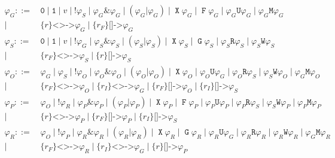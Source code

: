 \documentclass[a4paper,twoside,10pt,DIV=12,draft]{scrreprt}
\DeclareMathOperator{\F}{\texttt{F}}
\DeclareMathOperator{\G}{\texttt{G}}
\newcommand{\U}{\mathbin{\texttt{U}}}
\newcommand{\R}{\mathbin{\texttt{R}}}
\DeclareMathOperator{\X}{\texttt{X}}
\newcommand{\M}{\mathbin{\texttt{M}}}
\newcommand{\W}{\mathbin{\texttt{W}}}
\DeclareMathOperator{\NOT}{\texttt{!}}
\newcommand{\OR}{\mathbin{\texttt{|}}}
\newcommand{\AND}{\mathbin{\texttt{\&}}}
\newcommand{\0}{\texttt{0}}
\newcommand{\1}{\texttt{1}}
\newcommand{\Esuffix}{\texttt{<>->}}
\newcommand{\Asuffix}{\texttt{[]->}}
\newcommand{\ratgroup}[1]{\texttt{\{}#1\texttt{\}}}
\begin{document}
\begin{align*}
  \varphi_G ::=&\, \0\mid\1\mid v\mid \NOT\varphi_S\mid
                   \varphi_G\AND \varphi_G\mid (\varphi_G\OR \varphi_G)\mid
                   \X\varphi_G \mid \F\varphi_G\mid
                   \varphi_G\U\varphi_G\mid \varphi_G\M\varphi_G\\
           \mid&\, \ratgroup{r}\Esuffix \varphi_G\mid
                   \ratgroup{r_F}\Asuffix \varphi_G\\
  \varphi_S ::=&\, \0\mid\1\mid v\mid \NOT\varphi_G\mid
                   \varphi_S\AND \varphi_S\mid (\varphi_S\OR \varphi_S)\mid
                   \X\varphi_S \mid \G\varphi_S\mid
                   \varphi_S\R\varphi_S\mid \varphi_S\W\varphi_S\\
           \mid&\, \ratgroup{r_F}\Esuffix \varphi_S\mid
                   \ratgroup{r}\Asuffix \varphi_S\\
  \varphi_O ::=&\, \varphi_G \mid \varphi_S\mid \NOT\varphi_O\mid
                   \varphi_O\AND \varphi_O\mid (\varphi_O\OR \varphi_O)\mid
                   \X\varphi_O \mid
                   \varphi_O\U\varphi_G\mid\varphi_O\R\varphi_S \mid
                   \varphi_S\W\varphi_O\mid \varphi_G\M\varphi_O\\
           \mid&\, \ratgroup{r_F}\Esuffix \varphi_O \mid \ratgroup{r_I}\Esuffix \varphi_G\mid
                  \ratgroup{r_F}\Asuffix \varphi_O\mid
                   \ratgroup{r_I}\Asuffix \varphi_S\\
  \varphi_P ::=&\, \varphi_O \mid \NOT\varphi_R\mid
                   \varphi_P\AND \varphi_P\mid (\varphi_P\OR \varphi_P)\mid
                   \X\varphi_P \mid \F\varphi_P \mid
                   \varphi_P\U\varphi_P\mid\varphi_P\R\varphi_S\mid
                   \varphi_S\W\varphi_P\mid\varphi_P\M\varphi_P\\
           \mid&\, \ratgroup{r}\Esuffix \varphi_P\mid
                   \ratgroup{r_F}\Asuffix \varphi_P\mid
                   \ratgroup{r_I}\Asuffix \varphi_S\\
  \varphi_R ::=&\, \varphi_O \mid \NOT\varphi_P\mid
                   \varphi_R\AND \varphi_R\mid (\varphi_R\OR \varphi_R)\mid
                   \X\varphi_R \mid \G\varphi_R \mid
                   \varphi_R\U\varphi_G\mid\varphi_R\R\varphi_R\mid
                   \varphi_R\W\varphi_R\mid\varphi_G\M\varphi_R\\
           \mid&\, \ratgroup{r_F}\Esuffix \varphi_R \mid \ratgroup{r_I}\Esuffix \varphi_G\mid \ratgroup{r}\Asuffix \varphi_P\\
\end{align*}
\end{document}
